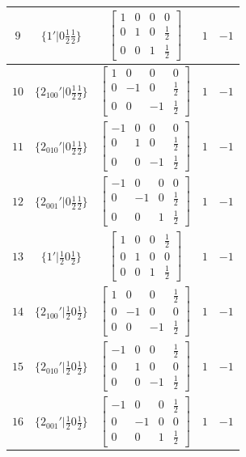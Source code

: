 \documentclass[fleqn,8pt]{jsarticle}
\begin{document}
\begin{longtable}{ccccc}
$ 9 $ & $ \{1{}'|0 \frac{1}{2} \frac{1}{2}\} $ & $ \begin{bmatrix} 1 & 0 & 0 & 0 \\ 0 & 1 & 0 & \frac{1}{2} \\ 0 & 0 & 1 & \frac{1}{2} \end{bmatrix} $ & $ 1 $ & $ -1 $ \\ \hline
$ 10 $ & $ \{2{}_{100}{}'|0 \frac{1}{2} \frac{1}{2}\} $ & $ \begin{bmatrix} 1 & 0 & 0 & 0 \\ 0 & -1 & 0 & \frac{1}{2} \\ 0 & 0 & -1 & \frac{1}{2} \end{bmatrix} $ & $ 1 $ & $ -1 $ \\ \hline
$ 11 $ & $ \{2{}_{010}{}'|0 \frac{1}{2} \frac{1}{2}\} $ & $ \begin{bmatrix} -1 & 0 & 0 & 0 \\ 0 & 1 & 0 & \frac{1}{2} \\ 0 & 0 & -1 & \frac{1}{2} \end{bmatrix} $ & $ 1 $ & $ -1 $ \\ \hline
$ 12 $ & $ \{2{}_{001}{}'|0 \frac{1}{2} \frac{1}{2}\} $ & $ \begin{bmatrix} -1 & 0 & 0 & 0 \\ 0 & -1 & 0 & \frac{1}{2} \\ 0 & 0 & 1 & \frac{1}{2} \end{bmatrix} $ & $ 1 $ & $ -1 $ \\ \hline
$ 13 $ & $ \{1{}'|\frac{1}{2} 0 \frac{1}{2}\} $ & $ \begin{bmatrix} 1 & 0 & 0 & \frac{1}{2} \\ 0 & 1 & 0 & 0 \\ 0 & 0 & 1 & \frac{1}{2} \end{bmatrix} $ & $ 1 $ & $ -1 $ \\ \hline
$ 14 $ & $ \{2{}_{100}{}'|\frac{1}{2} 0 \frac{1}{2}\} $ & $ \begin{bmatrix} 1 & 0 & 0 & \frac{1}{2} \\ 0 & -1 & 0 & 0 \\ 0 & 0 & -1 & \frac{1}{2} \end{bmatrix} $ & $ 1 $ & $ -1 $ \\ \hline
$ 15 $ & $ \{2{}_{010}{}'|\frac{1}{2} 0 \frac{1}{2}\} $ & $ \begin{bmatrix} -1 & 0 & 0 & \frac{1}{2} \\ 0 & 1 & 0 & 0 \\ 0 & 0 & -1 & \frac{1}{2} \end{bmatrix} $ & $ 1 $ & $ -1 $ \\ \hline
$ 16 $ & $ \{2{}_{001}{}'|\frac{1}{2} 0 \frac{1}{2}\} $ & $ \begin{bmatrix} -1 & 0 & 0 & \frac{1}{2} \\ 0 & -1 & 0 & 0 \\ 0 & 0 & 1 & \frac{1}{2} \end{bmatrix} $ & $ 1 $ & $ -1 $ \\
\end{longtable}
\end{document}
